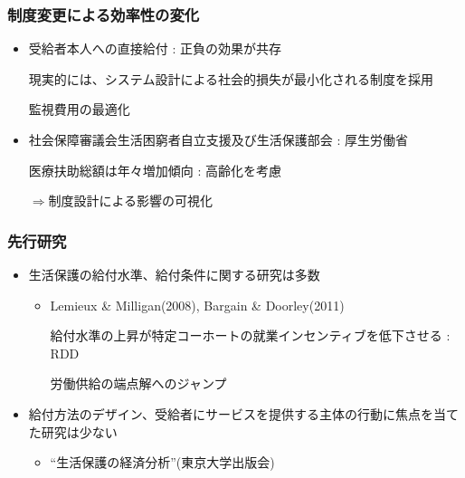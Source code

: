 \documentclass[dvipdfmx,14pt]{beamer}
\begin{document}
\begin{frame}\frametitle{制度変更による効率性の変化}

 \begin{itemize}
 
 \item 受給者本人への直接給付 : 正負の効果が共存
 
 現実的には、システム設計による社会的損失が最小化される制度を採用
 
 監視費用の最適化
 
 \item 社会保障審議会生活困窮者自立支援及び生活保護部会 : 厚生労働省
 
 医療扶助総額は年々増加傾向 : 高齢化を考慮
 
 $\Rightarrow$制度設計による影響の可視化
 
 
 \end{itemize}

\end{frame}

\begin{frame}\frametitle{先行研究}

 \begin{itemize}
 
 \item 生活保護の給付水準、給付条件に関する研究は多数
 
  \begin{itemize}
  
  \item Lemieux \& Milligan(2008), Bargain \& Doorley(2011)
  
  給付水準の上昇が特定コーホートの就業インセンティブを低下させる : RDD
  
  労働供給の端点解へのジャンプ
  
  \end{itemize}
 
 \item 給付方法のデザイン、受給者にサービスを提供する主体の行動に焦点を当てた研究は少ない
 
  \begin{itemize}
  
  \item ``生活保護の経済分析''(東京大学出版会)
  
  \end{itemize}
 
 \end{itemize}

\end{frame}
\end{document}
